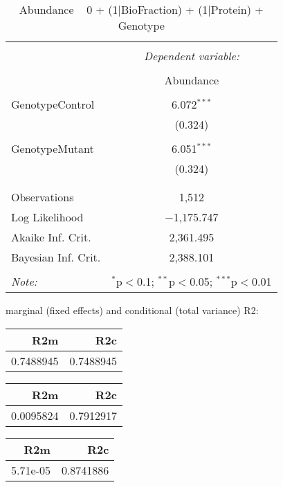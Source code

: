 \documentclass[11pt]{report}
\begin{document}
\begin{table}[!htbp] \centering 
  \caption{Abundance ~ 0 + (1|BioFraction) + (1|Protein) + Genotype} 
  \label{} 
\begin{tabular}{@{\extracolsep{5pt}}lc} 
\\[-1.8ex]\hline 
\hline \\[-1.8ex] 
 & \multicolumn{1}{c}{\textit{Dependent variable:}} \\ 
\cline{2-2} 
\\[-1.8ex] & Abundance \\ 
\hline \\[-1.8ex] 
 GenotypeControl & 6.072$^{***}$ \\ 
  & (0.324) \\ 
  & \\ 
 GenotypeMutant & 6.051$^{***}$ \\ 
  & (0.324) \\ 
  & \\ 
\hline \\[-1.8ex] 
Observations & 1,512 \\ 
Log Likelihood & $-$1,175.747 \\ 
Akaike Inf. Crit. & 2,361.495 \\ 
Bayesian Inf. Crit. & 2,388.101 \\ 
\hline 
\hline \\[-1.8ex] 
\textit{Note:}  & \multicolumn{1}{r}{$^{*}$p$<$0.1; $^{**}$p$<$0.05; $^{***}$p$<$0.01} \\ 
\end{tabular} 
\end{table} 
marginal (fixed effects) and conditional (total variance) R2:

\begin{tabular}{r|r}
\hline
R2m & R2c\\
\hline
0.7488945 & 0.7488945\\
\hline
\end{tabular}

\begin{tabular}{r|r}
\hline
R2m & R2c\\
\hline
0.0095824 & 0.7912917\\
\hline
\end{tabular}

\begin{tabular}{r|r}
\hline
R2m & R2c\\
\hline
5.71e-05 & 0.8741886\\
\hline
\end{tabular}
\end{document}

